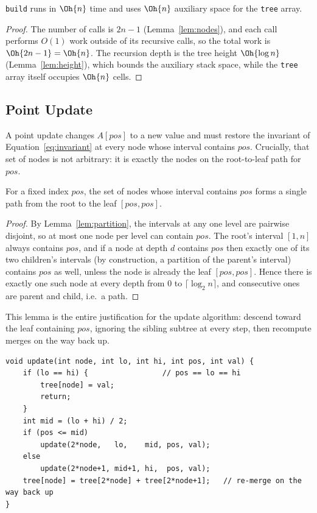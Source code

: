 \begin{lem}\label{lem:build-time}
\texttt{build} runs in $\Oh{n}$ time and uses $\Oh{n}$ auxiliary space for the \texttt{tree} array.
\end{lem}
\begin{proof}
The number of calls is $2n-1$ (Lemma~\ref{lem:nodes}), and each call performs $O(1)$ work outside of its recursive calls, so the total work is $\Oh{2n-1}=\Oh{n}$. The recursion depth is the tree height $\Oh{\log n}$ (Lemma~\ref{lem:height}), which bounds the auxiliary stack space, while the \texttt{tree} array itself occupies $\Oh{n}$ cells.
\end{proof}

\subsection{Point Update}
\label{sec:update}
A point update changes $A[pos]$ to a new value and must restore the invariant of Equation~\eqref{eq:invariant} at every node whose interval contains $pos$. Crucially, that set of nodes is not arbitrary: it is exactly the nodes on the root-to-leaf path for $pos$.

\begin{lem}\label{lem:update-path}
For a fixed index $pos$, the set of nodes whose interval contains $pos$ forms a single path from the root to the leaf $[pos,pos]$.
\end{lem}
\begin{proof}
By Lemma~\ref{lem:partition}, the intervals at any one level are pairwise disjoint, so at most one node per level can contain $pos$. The root's interval $[1,n]$ always contains $pos$, and if a node at depth $d$ contains $pos$ then exactly one of its two children's intervals (by construction, a partition of the parent's interval) contains $pos$ as well, unless the node is already the leaf $[pos,pos]$. Hence there is exactly one such node at every depth from $0$ to $\lceil\log_2 n\rceil$, and consecutive ones are parent and child, i.e.\ a path.
\end{proof}

This lemma is the entire justification for the update algorithm: descend toward the leaf containing $pos$, ignoring the sibling subtree at every step, then recompute merges on the way back up.

\begin{lstlisting}[style=cpp, caption={Point update.}, label={alg:update}]
void update(int node, int lo, int hi, int pos, int val) {
    if (lo == hi) {                 // pos == lo == hi
        tree[node] = val;
        return;
    }
    int mid = (lo + hi) / 2;
    if (pos <= mid)
        update(2*node,   lo,    mid, pos, val);
    else
        update(2*node+1, mid+1, hi,  pos, val);
    tree[node] = tree[2*node] + tree[2*node+1];   // re-merge on the way back up
}
\end{lstlisting}


